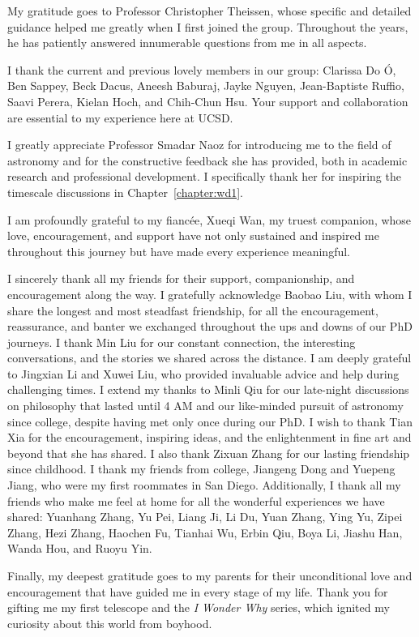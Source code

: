 \documentclass[12pt]{ucsddissertation}
\begin{document}
\begin{CJK*}{UTF8}{gbsn}
\begin{acknowledgements}
My gratitude goes to Professor Christopher Theissen, whose specific and detailed guidance helped me greatly when I first joined the group. Throughout the years, he has patiently answered innumerable questions from me in all aspects.

I thank the current and previous lovely members in our group: Clarissa Do Ó, Ben Sappey, Beck Dacus, Aneesh Baburaj, Jayke Nguyen, Jean-Baptiste Ruffio, Saavi Perera, Kielan Hoch, and Chih-Chun Hsu. Your support and collaboration are essential to my experience here at UCSD.

I greatly appreciate Professor Smadar Naoz for introducing me to the field of astronomy and for the constructive feedback she has provided, both in academic research and professional development. I specifically thank her for inspiring the timescale discussions in Chapter~\ref{chapter:wd1}.

I am profoundly grateful to my fianc\'ee, Xueqi Wan, my truest companion, whose love, encouragement, and support have not only sustained and inspired me throughout this journey but have made every experience meaningful.

I sincerely thank all my friends for their support, companionship, and encouragement along the way. I gratefully acknowledge Baobao Liu, with whom I share the longest and most steadfast friendship, for all the encouragement, reassurance, and banter we exchanged throughout the ups and downs of our PhD journeys. I thank Min Liu for our constant connection, the interesting conversations, and the stories we shared across the distance. I am deeply grateful to Jingxian Li and Xuwei Liu, who provided invaluable advice and help during challenging times. I extend my thanks to Minli Qiu for our late-night discussions on philosophy that lasted until 4 AM and our like-minded pursuit of astronomy since college, despite having met only once during our PhD.  I wish to thank Tian Xia for the encouragement, inspiring ideas, and the enlightenment in fine art and beyond that she has shared. I also thank Zixuan Zhang for our lasting friendship since childhood. I thank my friends from college, Jiangeng Dong and Yuepeng Jiang, who were my first roommates in San Diego. Additionally, I thank all my friends who make me feel at home for all the wonderful experiences we have shared: Yuanhang Zhang, Yu Pei, Liang Ji, Li Du, Yuan Zhang, Ying Yu, Zipei Zhang, Hezi Zhang, Haochen Fu, Tianhai Wu, Erbin Qiu, Boya Li, Jiashu Han, Wanda Hou, and Ruoyu Yin.

Finally, my deepest gratitude goes to my parents for their unconditional love and encouragement that have guided me in every stage of my life. Thank you for gifting me my first telescope and the \textit{I Wonder Why} series, which ignited my curiosity about this world from boyhood.



\end{acknowledgements}
\end{CJK*}
\end{document}
